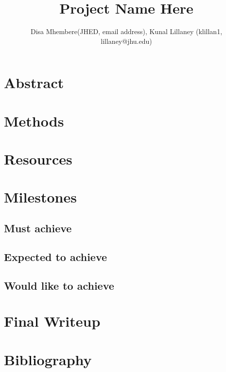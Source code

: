 \documentclass[11pt]{article}
\title{Project Name Here}
\author{Disa Mhembere(JHED, email address), Kunal Lillaney (klillan1, lillaney@jhu.edu)}
\date{}
\begin{document}
\maketitle

\section{Abstract}

\section{Methods}

\section{Resources}

\section{Milestones}
\subsection{Must achieve}

\subsection{Expected to achieve}

\subsection{Would like to achieve}


\section{Final Writeup}

\section{Bibliography}
\end{document}
